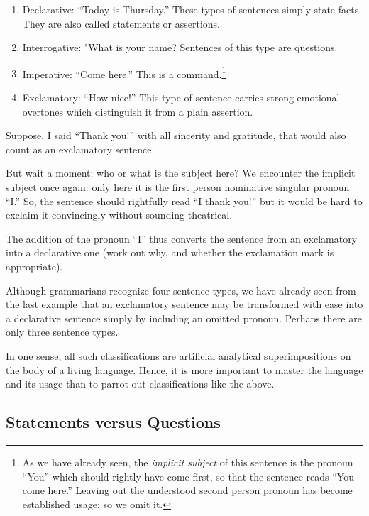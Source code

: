 \documentclass[
  12pt,
  a4paper,
]{article}
\begin{document}
\begin{enumerate}
\item
  Declarative: ``Today is Thursday.'' These types of sentences simply
  state facts. They are also called statements or assertions.
\item
  Interrogative: "What is your name? Sentences of this type are
  questions.
\item
  Imperative: ``Come here.'' This is a command.\footnote{ As we have
    already seen, the \emph{implicit subject} of this sentence is the
    pronoun ``You'' which should rightly have come first, so that the
    sentence reads ``You come here.'' Leaving out the understood second
    person pronoun has become established usage; so we omit it.}
\item
  Exclamatory: ``How nice!'' This type of sentence carries strong
  emotional overtones which distinguish it from a plain assertion.
\end{enumerate}

Suppose, I said ``Thank you!'' with all sincerity and gratitude, that
would also count as an exclamatory sentence.

But wait a moment: who or what is the subject here? We encounter the
implicit subject once again: only here it is the first person nominative
singular pronoun ``I.'' So, the sentence should rightfully read ``I
thank you!'' but it would be hard to exclaim it convincingly without
sounding theatrical.

The addition of the pronoun ``I'' thus converts the sentence from an
exclamatory into a declarative one (work out why, and whether the
exclamation mark is appropriate).

Although grammarians recognize four sentence types, we have already seen
from the last example that an exclamatory sentence may be transformed
with ease into a declarative sentence simply by including an omitted
pronoun. Perhaps there are only three sentence types.

In one sense, all such classifications are artificial analytical
superimpositions on the body of a living language. Hence, it is more
important to master the language and its usage than to parrot out
classifications like the above.

\hypertarget{statements-versus-questions}{%
\subsection{Statements versus
Questions}\label{statements-versus-questions}}
\end{document}
